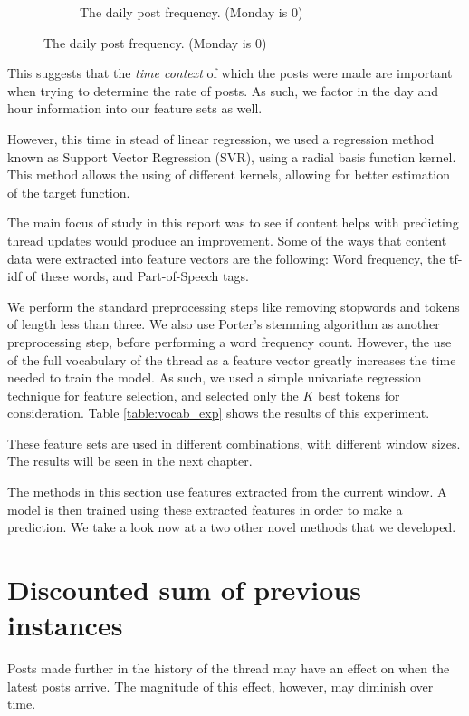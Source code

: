 \begin{figure}
\begin{center}
\begin{subfigure}[b]{0.45\textwidth}
\caption{The daily post frequency. (Monday is 0)}
\label{fig:week_freq}
	\end{subfigure}
\end{center}
\end{figure}


This suggests that the \emph{time context} of which the posts were made are 
important when trying to determine the rate of posts.  As such, we factor in the 
day and hour information into our feature sets as well.

However, this time in stead of linear regression, we used a regression method 
known as Support Vector Regression (SVR), using a radial basis function kernel.  
This method allows the using of different kernels, allowing for better 
estimation of the target function.

The main focus of study in this report was to see if content helps with 
predicting thread updates would produce an improvement. Some of the ways that 
content data were extracted into feature vectors are the following: Word 
frequency, the tf-idf of these words, and Part-of-Speech tags.

We perform the standard preprocessing steps like removing stopwords and tokens 
of length less than three. We also use Porter's stemming algorithm as another 
preprocessing step, before performing a word frequency count. However, the use 
of the full vocabulary of the thread as a feature vector greatly increases the 
time needed to train the model. As such, we used a simple univariate regression 
technique for feature selection, and selected only the $K$ best tokens for 
consideration. Table \ref{table:vocab_exp} shows the results of this experiment.  

These feature sets are used in different combinations, with different window 
sizes. The results will be seen in the next chapter.

The methods in this section use features extracted from the current window. A 
model is then trained using these extracted features in order to make a 
prediction. We take a look now at a two other novel methods that we developed.

\section{Discounted sum of previous instances}
 
Posts made further in the history of the thread may have an effect on when the 
latest posts arrive. The magnitude of this effect, however, may diminish over 
time.

